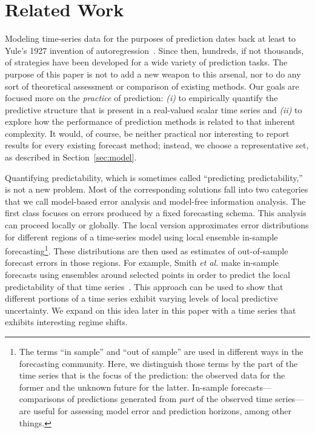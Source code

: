 \documentclass[%
pre,
reprint,
superscriptaddress,
showpacs,
nofootinbib,
nobibnotes,
 amsmath,amssymb,
 aps,
]{revtex4-1}
\newcommand{\svd}{{\tt dgesdd}\xspace}
\begin{document}
\section{Related Work }\label{sec:related}

Modeling time-series data for the purposes of prediction dates back at
least to Yule's 1927 invention of autoregression~\cite{Yule27}.  Since
then, hundreds, if not thousands, of strategies have been developed
for a wide variety of prediction tasks.  The purpose of this paper is
not to add a new weapon to this arsenal, nor to do any sort of
theoretical assessment or comparison of existing methods.  Our goals
are focused more on the \emph{practice} of prediction: \emph{(i)} to
empirically quantify the predictive structure that is present in a
real-valued scalar time series and \emph{(ii)} to explore how the
performance of prediction methods is related to that inherent
complexity.  It would, of course, be neither practical nor interesting
to report results for every existing forecast method; instead, we
choose a representative set, as described in Section~\ref{sec:model}.

Quantifying predictability, which is sometimes called ``predicting
predictability,'' is not a new problem.  Most of the corresponding
solutions fall into two categories that we call model-based error
analysis and model-free information analysis.
%
%
%
The first class focuses on errors produced by a fixed forecasting
schema.  This analysis can proceed locally or globally.  The local
version approximates error distributions for different regions of a
time-series model using local ensemble in-sample
forecasting\footnote{The terms ``in sample'' and ``out of sample'' are
  used in different ways in the forecasting community.  Here, we
  distinguish those terms by the part of the time series that is the
  focus of the prediction: the observed data for the former and the
  unknown future for the latter.  In-sample forecasts---comparisons of
  predictions generated from \emph{part} of the observed time
  series---are useful for assessing model error and prediction
  horizons, among other things.}.
%
These distributions are then used as estimates of out-of-sample
forecast errors in those regions.  For example, Smith \emph{et al.}
make in-sample forecasts using ensembles around selected points in
order to predict the local predictability of that time
series~\cite{Smith199250}.  This approach can be used to show that
different portions of a time series exhibit varying levels of
local predictive uncertainty.  We expand on this idea later in this
paper with a time series that exhibits interesting regime shifts.
\end{document}
